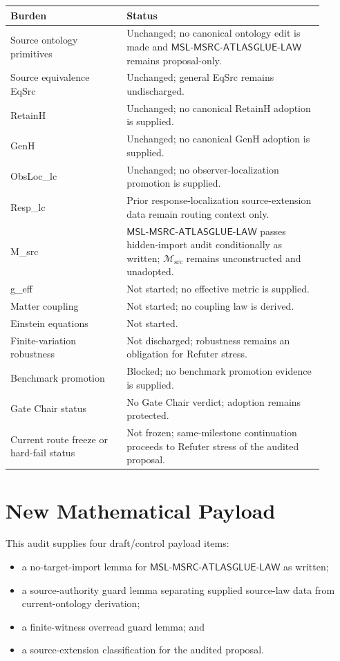 \documentclass[11pt]{article}
\newcommand{\Msrc}{\mathcal{M}_{\mathrm{src}}}
\newcommand{\MSL}{\mathsf{MSL}\mbox{-}\mathsf{MSRC}\mbox{-}\mathsf{ATLASGLUE}\mbox{-}\mathsf{LAW}}
\begin{document}
\begin{center}
\begin{tabular}{p{0.33\linewidth}p{0.57\linewidth}}
\hline
Burden & Status \\
\hline
Source ontology primitives & Unchanged; no canonical ontology edit is made and \(\MSL\) remains proposal-only. \\
Source equivalence EqSrc & Unchanged; general EqSrc remains undischarged. \\
RetainH & Unchanged; no canonical RetainH adoption is supplied. \\
GenH & Unchanged; no canonical GenH adoption is supplied. \\
ObsLoc\_lc & Unchanged; no observer-localization promotion is supplied. \\
Resp\_lc & Prior response-localization source-extension data remain routing context only. \\
M\_src & \(\MSL\) passes hidden-import audit conditionally as written; \(\Msrc\) remains unconstructed and unadopted. \\
g\_eff & Not started; no effective metric is supplied. \\
Matter coupling & Not started; no coupling law is derived. \\
Einstein equations & Not started. \\
Finite-variation robustness & Not discharged; robustness remains an obligation for Refuter stress. \\
Benchmark promotion & Blocked; no benchmark promotion evidence is supplied. \\
Gate Chair status & No Gate Chair verdict; adoption remains protected. \\
Current route freeze or hard-fail status & Not frozen; same-milestone continuation proceeds to Refuter stress of the audited proposal. \\
\hline
\end{tabular}
\end{center}

\section{New Mathematical Payload}

This audit supplies four draft/control payload items:
\begin{itemize}
  \item a no-target-import lemma for \(\MSL\) as written;
  \item a source-authority guard lemma separating supplied source-law data
  from current-ontology derivation;
  \item a finite-witness overread guard lemma; and
  \item a source-extension classification for the audited proposal.
\end{itemize}
\end{document}
